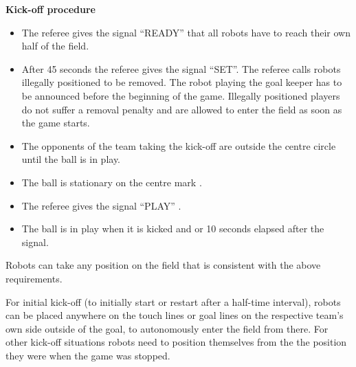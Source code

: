 \bigskip
 
{\bfseries Kick-off procedure}

\begin{itemize}
\item The referee gives the signal ``READY'' that all robots have to reach their
      own half of the field.
\item After  45 seconds the referee gives the signal ``SET''.
      The referee calls robots illegally positioned to be removed.
      The robot playing the goal keeper has to be announced before the beginning
      of the game.
      Illegally positioned players do not suffer a removal penalty and are
      allowed to enter the field as soon as the game starts.
\item The opponents of the team taking the kick-off are outside the centre circle until the ball is in play.
\item The ball is  stationary on the centre mark . 
\item The referee gives the signal ``PLAY''  .
\item The ball is in play when it is kicked and   or 10 seconds elapsed after the signal.
\end{itemize}

Robots can take any position on the field that is consistent with the above requirements.


\bigskip
 
For initial kick-off (to initially start or restart after a half-time interval),
robots can be placed anywhere on the touch lines or goal lines on the respective
team's own side outside of the goal,
to autonomously enter the field from there. 
For other kick-off situations  robots need to
position themselves from the the position they were when the game was stopped.


\bigskip

